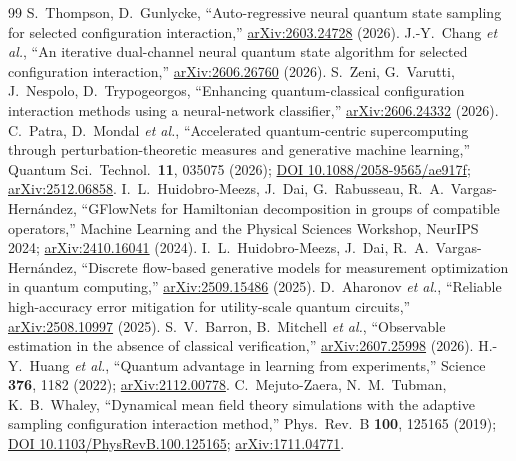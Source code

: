 \begin{thebibliography}{99}
 S.~Thompson, D.~Gunlycke, ``Auto-regressive neural quantum state sampling for selected configuration interaction,'' \href{https://arxiv.org/abs/2603.24728}{arXiv:2603.24728} (2026).
 J.-Y.~Chang \emph{et al.}, ``An iterative dual-channel neural quantum state algorithm for selected configuration interaction,'' \href{https://arxiv.org/abs/2606.26760}{arXiv:2606.26760} (2026).
 S.~Zeni, G.~Varutti, J.~Nespolo, D.~Trypogeorgos, ``Enhancing quantum-classical configuration interaction methods using a neural-network classifier,'' \href{https://arxiv.org/abs/2606.24332}{arXiv:2606.24332} (2026).
 C.~Patra, D.~Mondal \emph{et al.}, ``Accelerated quantum-centric supercomputing through perturbation-theoretic measures and generative machine learning,'' Quantum Sci.\ Technol.\ \textbf{11}, 035075 (2026); \href{https://doi.org/10.1088/2058-9565/ae917f}{DOI 10.1088/2058-9565/ae917f}; \href{https://arxiv.org/abs/2512.06858}{arXiv:2512.06858}.
 I.~L.~Huidobro-Meezs, J.~Dai, G.~Rabusseau, R.~A.~Vargas-Hern\'andez, ``GFlowNets for Hamiltonian decomposition in groups of compatible operators,'' Machine Learning and the Physical Sciences Workshop, NeurIPS 2024; \href{https://arxiv.org/abs/2410.16041}{arXiv:2410.16041} (2024).
 I.~L.~Huidobro-Meezs, J.~Dai, R.~A.~Vargas-Hern\'andez, ``Discrete flow-based generative models for measurement optimization in quantum computing,'' \href{https://arxiv.org/abs/2509.15486}{arXiv:2509.15486} (2025).
 D.~Aharonov \emph{et al.}, ``Reliable high-accuracy error mitigation for utility-scale quantum circuits,'' \href{https://arxiv.org/abs/2508.10997}{arXiv:2508.10997} (2025).
 S.~V.~Barron, B.~Mitchell \emph{et al.}, ``Observable estimation in the absence of classical verification,'' \href{https://arxiv.org/abs/2607.25998}{arXiv:2607.25998} (2026).
 H.-Y.~Huang \emph{et al.}, ``Quantum advantage in learning from experiments,'' Science \textbf{376}, 1182 (2022); \href{https://arxiv.org/abs/2112.00778}{arXiv:2112.00778}.
 C.~Mejuto-Zaera, N.~M.~Tubman, K.~B.~Whaley, ``Dynamical mean field theory simulations with the adaptive sampling configuration interaction method,'' Phys.\ Rev.\ B \textbf{100}, 125165 (2019); \href{https://doi.org/10.1103/PhysRevB.100.125165}{DOI 10.1103/PhysRevB.100.125165}; \href{https://arxiv.org/abs/1711.04771}{arXiv:1711.04771}.

\end{thebibliography}
